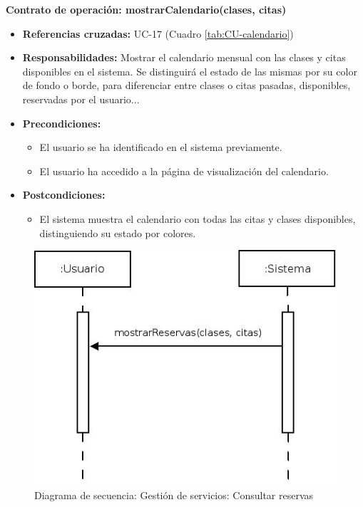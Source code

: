 \textbf{Contrato de operación: mostrarCalendario(clases, citas)}
\begin{itemize}
\item \textbf{Referencias cruzadas:} UC-17 (Cuadro \ref{tab:CU-calendario})
\item \textbf{Responsabilidades:} Mostrar el calendario mensual con las clases y citas disponibles en el sistema. Se distinguirá el estado de las mismas por su color de fondo o borde, para diferenciar entre clases o citas pasadas, disponibles, reservadas por el usuario...
\item \textbf{Precondiciones:} 
 \begin{itemize}
\item El usuario se ha identificado en el sistema previamente.
\item El usuario ha accedido a la página de visualización del calendario.
\end {itemize}
\item \textbf{Postcondiciones:} 
 \begin{itemize}
\item El sistema muestra el calendario con todas las citas y clases disponibles, distinguiendo su estado por colores. 
\end {itemize}
\end {itemize}


\vspace{7mm}
\dotfill
\vspace{7mm}

\begin{figure}[h!]
\centering
  \includegraphics[scale=.55]{img/secuencias/gestion-servicios-reservas.jpeg}
  \caption{Diagrama de secuencia: Gestión de servicios: Consultar reservas}
  \label{fig:secuencia-gestion-servicios-reservas}
\end{figure}

